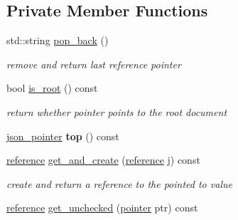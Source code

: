 \subsection*{Private Member Functions}
\begin{DoxyCompactItemize}
\item 
\hypertarget{classnlohmann_1_1basic__json_1_1json__pointer_a1f2a9e13d44824b29f0019ecdebf9775}{}\label{classnlohmann_1_1basic__json_1_1json__pointer_a1f2a9e13d44824b29f0019ecdebf9775} 
std\+::string \hyperlink{classnlohmann_1_1basic__json_1_1json__pointer_a1f2a9e13d44824b29f0019ecdebf9775}{pop\+\_\+back} ()
\begin{DoxyCompactList}\small\item\em remove and return last reference pointer \end{DoxyCompactList}\item 
\hypertarget{classnlohmann_1_1basic__json_1_1json__pointer_a5b6b777e007a992f07cb0856d296aca6}{}\label{classnlohmann_1_1basic__json_1_1json__pointer_a5b6b777e007a992f07cb0856d296aca6} 
bool \hyperlink{classnlohmann_1_1basic__json_1_1json__pointer_a5b6b777e007a992f07cb0856d296aca6}{is\+\_\+root} () const
\begin{DoxyCompactList}\small\item\em return whether pointer points to the root document \end{DoxyCompactList}\item 
\hypertarget{classnlohmann_1_1basic__json_1_1json__pointer_a48f5de12342d72e2a9712cc8490486f7}{}\label{classnlohmann_1_1basic__json_1_1json__pointer_a48f5de12342d72e2a9712cc8490486f7} 
\hyperlink{classnlohmann_1_1basic__json_1_1json__pointer}{json\+\_\+pointer} {\bfseries top} () const
\item 
\hyperlink{classnlohmann_1_1basic__json_a3ec8e17be8732fe436e9d6733f52b7a3}{reference} \hyperlink{classnlohmann_1_1basic__json_1_1json__pointer_aa046d74ac24c66027d5dd53ada039415}{get\+\_\+and\+\_\+create} (\hyperlink{classnlohmann_1_1basic__json_a3ec8e17be8732fe436e9d6733f52b7a3}{reference} j) const
\begin{DoxyCompactList}\small\item\em create and return a reference to the pointed to value \end{DoxyCompactList}\item 
\hyperlink{classnlohmann_1_1basic__json_a3ec8e17be8732fe436e9d6733f52b7a3}{reference} \hyperlink{classnlohmann_1_1basic__json_1_1json__pointer_a667ff8c80386a8f5b1f75966e7355c07}{get\+\_\+unchecked} (\hyperlink{classnlohmann_1_1basic__json_a9d1b58099dc64695fcf2847ab0b2a7c7}{pointer} ptr) const

\end{DoxyCompactItemize}
